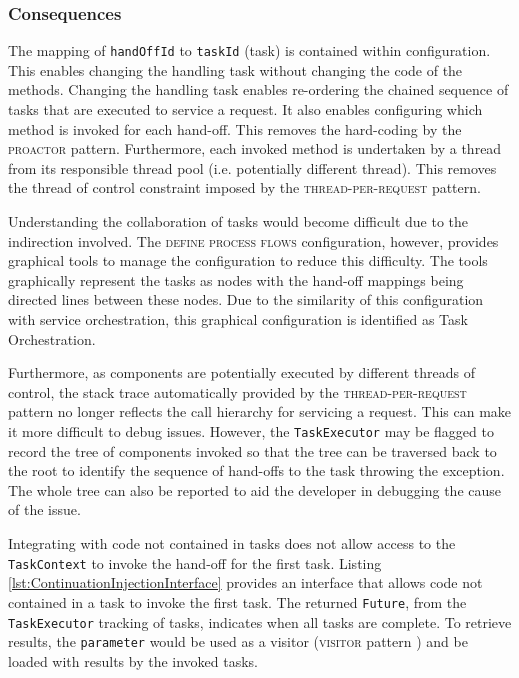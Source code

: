 \documentclass[prodmode]{style/acmlarge}
\begin{document}
\subsubsection*{Consequences}

The mapping of \texttt{handOffId} to \texttt{taskId} (task) is contained within
configuration.  This enables changing the handling task without changing the
code of the methods.  Changing the handling task enables re-ordering the chained
sequence of tasks that are executed to service a request.  It also enables
configuring which method is invoked for each hand-off.  This removes the
hard-coding by the \textsc{proactor} pattern.   Furthermore, each invoked method
is undertaken by a thread from its responsible thread pool (i.e.
potentially different thread).  This removes the thread of control constraint
imposed by the \textsc{thread-per-request} pattern.

Understanding the collaboration of tasks would become difficult due to the
indirection involved.  The \textsc{define process flows} configuration, however,
provides graphical tools to manage the configuration to reduce this difficulty.
The tools graphically represent the tasks as nodes with the hand-off mappings
being directed lines between these nodes.  Due to the similarity of this
configuration with service orchestration, this graphical configuration is
identified as Task Orchestration.

Furthermore, as components are potentially executed by different threads of
control, the stack trace automatically provided by the
\textsc{thread-per-request} pattern no longer reflects the call hierarchy for
servicing a request.  This can make it more difficult to debug issues.  However,
the \texttt{TaskExecutor} may be flagged to record the tree of components
invoked so that the tree can be traversed back to the root to identify the
sequence of hand-offs to the task throwing the exception.  The whole tree can
also be reported to aid the developer in debugging the cause of the issue.

Integrating with code not contained in tasks does not allow access to the
\texttt{TaskContext} to invoke the hand-off for the first task.  Listing
\ref{lst:ContinuationInjectionInterface} provides an interface that allows code
not contained in a task to invoke the first task.  The returned \texttt{Future},
from the \texttt{TaskExecutor} tracking of tasks, indicates when all tasks are
complete.  To retrieve results, the \texttt{parameter} would be used as a
visitor (\textsc{visitor} pattern \cite{gof}) and be loaded with results by the
invoked tasks.
\end{document}
